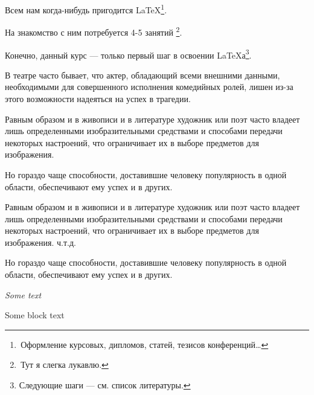 \documentclass[14pt,fleqn]{article}
\begin{document}
	Всем нам когда-нибудь пригодится \LaTeX\footnote{\,Оформление курсовых, дипломов, статей, тезисов конференций\ldots}.
	
	На знакомство с ним потребуется 4-5 занятий \footnote{\,Тут я слегка лукавлю.}.
	
	Конечно, данный курс --- только первый шаг в освоении \LaTeX а\footnote{Следующие шаги --- см. список литературы.}.
	
	
	
	\smallskip
	В театре часто бывает, что актер, обладающий всеми внешними данными, необходимыми для совершенного исполнения комедийных ролей, лишен из-за этого возможности надеяться на успех в трагедии.
	
	\medskip
	Равным образом и в живописи и в литературе художник или поэт часто владеет лишь определенными изобразительными средствами и способами передачи некоторых настроений, что ограничивает их в выборе предметов для изображения.
	
	\bigskip
	Но гораздо чаще способности, доставившие человеку популярность в одной области, обеспечивают ему успех и в других.
	
	
	\vspace{2cm}
	Равным образом \hspace{2cm} и в живописи и в литературе\hspace{12pt} художник или поэт часто владеет лишь определенными изобразительными средствами и способами передачи некоторых настроений, что ограничивает их в выборе предметов для изображения. \hfill ч.т.д.
	
	\vfill
	Но гораздо чаще способности, доставившие человеку популярность в одной области, обеспечивают ему успех и в других.
	
	
	\emph{Some text}
	
	\begin{em}
		Some block text
	\end{em}
\end{document}
